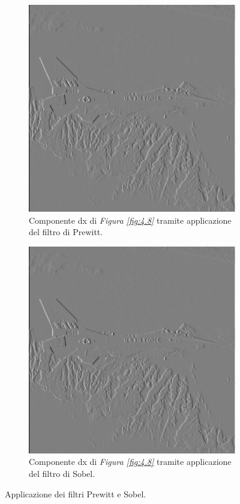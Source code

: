 \documentclass{subfiles}
\begin{document}
\begin{figure}[!h]
    \centering
    \begin{subfigure}[b]{0.4\textwidth}
        \centering
        \includegraphics[scale = 0.3]{../Images/Airplane/DeXAirplanePrewitt.png}
        \caption{Componente dx di \emph{Figura \ref{fig:4.8}} tramite applicazione del filtro di Prewitt.}
    \end{subfigure}
    \hspace{10pt}
    \begin{subfigure}[b]{0.4\textwidth}
        \centering
        \includegraphics[scale = 0.3]{../Images/Airplane/DeXAirplaneSobel.png}
        \caption{Componente dx di \emph{Figura \ref{fig:4.8}} tramite applicazione del filtro di Sobel.}
    \end{subfigure}
    \caption{Applicazione dei filtri Prewitt e Sobel.}
    \label{fig:4.12}
\end{figure}
\end{document}
